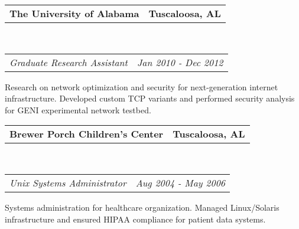 \documentclass[12pt,letterpaper]{article}
\makeatletter
\newcommand{\headerrow}[2]
{\begin{tabular*}{\linewidth}{l@{\extracolsep{\fill}}r}
	#1 &
	#2 \\
\end{tabular*}}
\newcommand{\employment}[5]{
	\headerrow
		{\textbf{#1}}
		{\textbf{#2}}
	\\
	\headerrow
		{\emph{#3}}
		{\emph{#4}}
	\begin{itemize*}
		\item #5
	\end{itemize*}
}
\makeatother
\begin{document}
\employment{The University of Alabama}{Tuscaloosa, AL}{Graduate Research Assistant}{Jan 2010 - Dec 2012}{
Research on network optimization and security for next-generation internet infrastructure. Developed custom TCP variants and performed security analysis for GENI experimental network testbed.
}

\employment{Brewer Porch Children's Center}{Tuscaloosa, AL}{Unix Systems Administrator}{Aug 2004 - May 2006}{
Systems administration for healthcare organization. Managed Linux/Solaris infrastructure and ensured HIPAA compliance for patient data systems.
}
\end{document}
